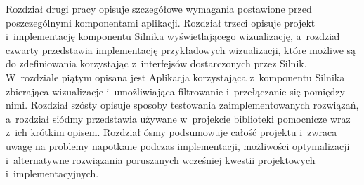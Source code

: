 Rozdział drugi pracy opisuje szczegółowe wymagania postawione przed poszczególnymi komponentami aplikacji. Rozdział trzeci opisuje projekt i~implementację komponentu Silnika wyświetlającego wizualizację, a~rozdział czwarty przedstawia implementację przykładowych wizualizacji, które możliwe są do zdefiniowania korzystając z~interfejsów dostarczonych przez Silnik. W~rozdziale piątym opisana jest Aplikacja korzystająca z~komponentu Silnika zbierająca wizualizacje i~umożliwiająca filtrowanie i~przełączanie się pomiędzy nimi. Rozdział szósty opisuje sposoby testowania zaimplementowanych rozwiązań, a~rozdział siódmy przedstawia używane w~projekcie biblioteki pomocnicze wraz z~ich krótkim opisem. Rozdział ósmy podsumowuje całość projektu i~zwraca uwagę na problemy napotkane podczas implementacji, możliwości optymalizacji i~alternatywne rozwiązania poruszanych wcześniej kwestii projektowych i~implementacyjnych.
